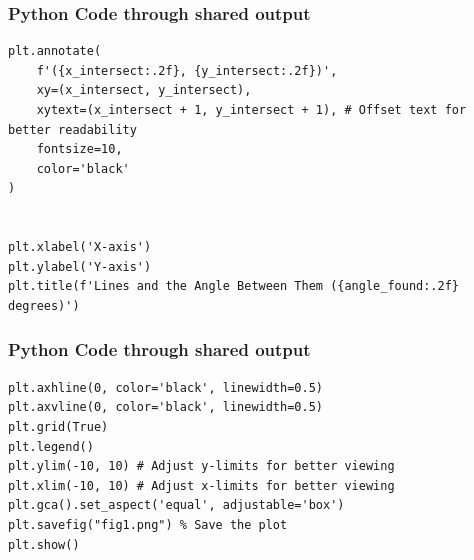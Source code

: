 \documentclass{beamer}
\begin{document}
\begin{frame}[fragile]
\frametitle{Python Code through shared output }

\begin{lstlisting}
plt.annotate(
    f'({x_intersect:.2f}, {y_intersect:.2f})',
    xy=(x_intersect, y_intersect),
    xytext=(x_intersect + 1, y_intersect + 1), # Offset text for better readability
    fontsize=10,
    color='black'
)


plt.xlabel('X-axis')
plt.ylabel('Y-axis')
plt.title(f'Lines and the Angle Between Them ({angle_found:.2f} degrees)')
\end{lstlisting}
\end{frame}

\begin{frame}[fragile]
\frametitle{Python Code through shared output }

\begin{lstlisting}
plt.axhline(0, color='black', linewidth=0.5)
plt.axvline(0, color='black', linewidth=0.5)
plt.grid(True)
plt.legend()
plt.ylim(-10, 10) # Adjust y-limits for better viewing
plt.xlim(-10, 10) # Adjust x-limits for better viewing
plt.gca().set_aspect('equal', adjustable='box')
plt.savefig("fig1.png") % Save the plot
plt.show()
\end{lstlisting}
\end{frame}
\end{document}
